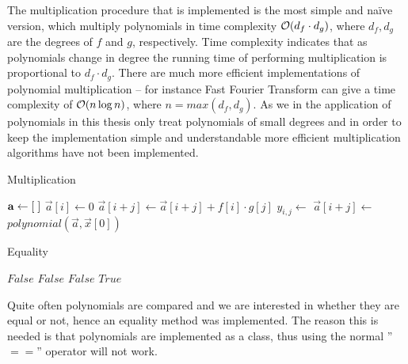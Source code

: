 The multiplication procedure that is implemented is the most simple and naïve version, which multiply polynomials in time complexity $\mathcal{O}(d_f\cdot d_g)$, where $d_f,d_g$ are the degrees of $f$ and $g$, respectively. Time complexity indicates that as polynomials change in degree the running time of performing multiplication is proportional to $d_f\cdot d_g$. There are much more efficient implementations of polynomial multiplication -- for instance Fast Fourier Transform can give a time complexity of $\mathcal{O}(n\log n)$, where $n=max(d_f,d_g)$. As we in the application of polynomials in this thesis only treat polynomials of small degrees and in order to keep the implementation simple and understandable more efficient multiplication algorithms have not been implemented.
\begin{algorithm}[H]
  \caption{Multiplication}
  \begin{algorithmic}[1]
      \State $\mathbf{a}\gets [\hspace*{1mm}]$
        \State $\vec{a}[i]\gets 0$
      \EndFor
            \State $\vec{a}[i+j]\gets \vec{a}[i+j] + f[i]\cdot g[j]$
          \Else
            \State $y_{i,j}\gets$ 
            \State $\vec{a}[i+j]\gets$ 
          \EndIf
        \EndFor
      \EndFor
      \State \Return $polynomial(\vec{a},\vec{x}[0])$
    \EndProcedure
  \end{algorithmic}
\end{algorithm}

\begin{algorithm}[H]
  \caption{Equality}
  \begin{algorithmic}[1]
        \State \Return $False$
      \EndIf
          \State \Return $False$
          \State \Return $False$
        \EndIf
      \EndFor
      \State \Return $True$
    \EndProcedure
  \end{algorithmic}
\end{algorithm}
Quite often polynomials are compared and we are interested in whether they are equal or not, hence an equality method was implemented. The reason this is needed is that polynomials are implemented as a class, thus using the normal ''$==$'' operator will not work.

